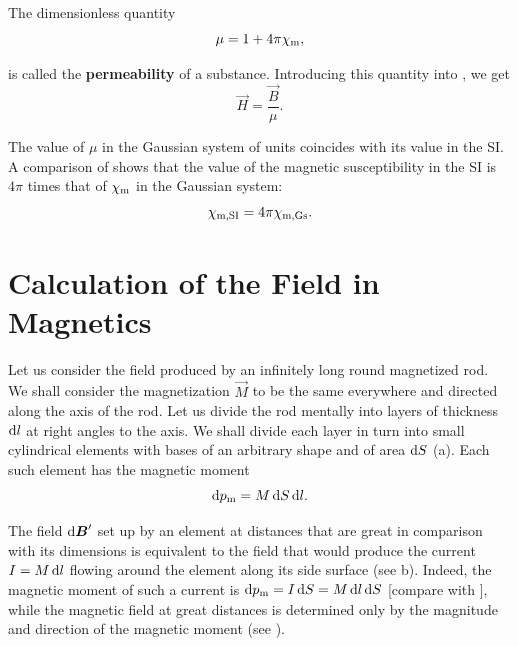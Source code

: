 The dimensionless quantity
\begin{equation}\label{eq:7_19}
    \mu = 1 + 4\pi\chi_{\text{m}},
\end{equation}

\noindent
is called the \textbf{permeability} of a substance.
Introducing this quantity into , we get
\begin{equation}\label{eq:7_20}
    \vec{H} = \frac{\vec{B}}{\mu}.
\end{equation}

The value of $\mu$ in the Gaussian system of units coincides with its value in the SI.
A comparison of  shows that the value of the magnetic susceptibility in the SI is $4\pi$ times that of $\chi_{\text{m}}$ in the Gaussian system:
\begin{equation}\label{eq:7_21}
    \chi_{\text{m,SI}} = 4\pi\chi_{\text{m,Gs}}.
\end{equation}

\section{Calculation of the Field in Magnetics}\label{sec:7_3}

Let us consider the field produced by an infinitely long round magnetized rod. We shall consider the magnetization $\vec{M}$ to be the same everywhere and directed along the axis of the rod.
Let us divide the rod mentally into layers of thickness $\mathrm{d} l$ at right angles to the axis.
We shall divide each layer in turn into small cylindrical elements with bases of an arbitrary shape and of area $\mathrm{d} S$ (a).
Each such element has the magnetic moment
\begin{equation}\label{eq:7_22}
    \mathrm{d}p_{\text{m}} = M\, \mathrm{d} S\, \mathrm{d} l.
\end{equation}

The field $\mathrm{d}\boldsymbol{B}'$ set up by an element at distances that are great in comparison with its dimensions is equivalent to the field that would produce the current $I=M\,\mathrm{d} l$ flowing around the element along its side surface (see b).
Indeed, the magnetic moment of such a current is $\mathrm{d}p_{\text{m}}=I\,\mathrm{d} S=M\,\mathrm{d} l\,\mathrm{d} S$ [compare with ], while the magnetic field at great distances is determined only by the
magnitude and direction of the magnetic moment (see ).

